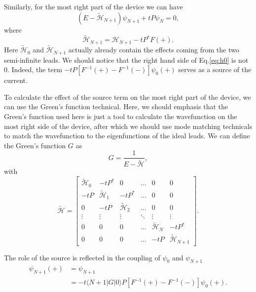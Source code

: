 \documentclass[journal]{IEEEtran}
\begin{document}
Similarly, for the most right part of the device we can have
\begin{equation}
    (E-\tilde{\mathcal{H}}_{N+1})\psi_{N+1}+tP\psi_N=0,
    \label{}
\end{equation}
where 
\begin{equation}
    \tilde{\mathcal{H}}_{N+1}=\mathcal{H}_{N+1}-tP^*F(+).
    \label{}
\end{equation}
Here $\tilde{\mathcal{H}}_0$ and $\tilde{\mathcal{H}}_{N+1}$ actually already contain the effects coming from the two
semi-infinite leads. We should notice that the right hand side of Eq.\ref{eq:h0} is not $0$. Indeed, the term
$-tP[F^{-1}(+)-F^{-1}(-)]\psi_0(+)$ serves as a source of the current.

To calculate the effect of the source term on the most right part of the device, we can use the Green's function
technical. Here, we should emphasis that the Green's function used here is just a tool to calculate the wavefunction on
the most right side of the device, after which we should use mode matching technicals to match the wavefunction to the
eigenfunctions of the ideal leads. We can define the Green's function $G$ as
\begin{equation}
    G=\frac{1}{E-\tilde{\mathcal{H}}},
    \label{}
\end{equation}
with
\begin{equation}
    \tilde{\mathcal{H}}=\left[
        \begin{array}{cccccc}
            \tilde{\mathcal{H}}_0 & -tP^* & 0 & \dots & 0 & 0 \\
            -tP & \tilde{\mathcal{H}}_1 & -tP^* & \dots & 0 & 0 \\
            0 & -tP & \tilde{\mathcal{H}}_2 & \dots & 0 & 0 \\
            \vdots & \vdots & \vdots & \ddots & \vdots & \vdots \\
            0 & 0 & 0 & \dots & \tilde{\mathcal{H}}_N & -tP^* \\
            0 & 0 & 0 & \dots & -tP & \tilde{\mathcal{H}}_{N+1}
    \end{array}\right].
    \label{}
\end{equation}

The role of the source is reflected in the coupling of $\psi_0$ and $\psi_{N+1}$
\begin{equation}
    \begin{split}
    \psi_{N+1}(+)&=\psi_{N+1} \\
    &=-t\langle N+1|G|0\rangle P[F^{-1}(+)-F^{-1}(-)]\psi_0(+).
\end{split}
    \label{}
\end{equation}
\end{document}
